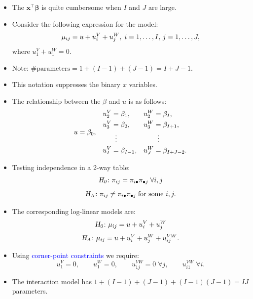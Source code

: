 \documentclass{article}\usepackage[]{graphicx}\usepackage[svgnames]{xcolor}
\let\log\relax%
\newcommand{\HN}{\textsl{H}_{\textsl{0}}}%
\newcommand{\HA}{\textsl{H}_{\textsl{A}}}%
\providecommand{\Vector}[1]{\bm{#1}}%
\begin{document}
\begin{itemize}
      \item The $ \Vector{x}^\top \Vector{\beta} $ is quite cumbersome when $ I $ and $ J $ are large.
      \item Consider the following expression for the model:
            \[ \log{\mu_{ij}}=u+u_i^V+u_j^W,\;i=1,\ldots,I,\,j=1,\ldots,J, \]
            where $ u_1^V+u_1^W=0 $.
      \item Note: $ \text{\# parameters}=1+(I-1)+(J-1)=I+J-1 $.
      \item This notation suppresses the binary $ x $ variables.
      \item The relationship between the $ \beta $ and $ u $ is as follows:
            \[ \begin{array}{ccc}
                        u=\beta_0,                 &
                        \begin{aligned}
                              u_2^V & =\beta_1,       \\
                              u_3^V & =\beta_2,       \\
                                    & \vdotswithin{=} \\
                              u_I^V & =\beta_{I-1},
                        \end{aligned} &
                        \begin{aligned}
                              u_2^W & =\beta_I,       \\
                              u_3^W & =\beta_{I+1},   \\
                                    & \vdotswithin{=} \\
                              u_J^W & =\beta_{I+J-2}.
                        \end{aligned}
                  \end{array} \]
      \item Testing independence in a 2-way table:
            \[ \HN\colon \pi_{ij}=\pi_{i\bullet}\pi_{\bullet j}\;\forall i,j \]
            \[ \HA\colon \pi_{ij}\ne \pi_{i\bullet}\pi_{\bullet j}\;\text{for some } i,j. \]
      \item The corresponding log-linear models are:
            \[ \HN\colon \log{\mu_{ij}}=u+u_i^V+u_j^W \]
            \[ \HA\colon\log{\mu_{ij}}=u+u_i^V+u_j^W+u_{ij}^{VW}. \]
      \item Using \textcolor{Blue}{corner-point constraints} we require:
            \[ u_1^V=0,\qquad u_1^W=0,\qquad u_{1j}^{VW}=0\;\forall j,\qquad u_{i1}^{VW}\;\forall i. \]
      \item The interaction model has $ 1+(I-1)+(J-1)+(I-1)(J-1)=IJ $ parameters.

\end{itemize}
\end{document}
